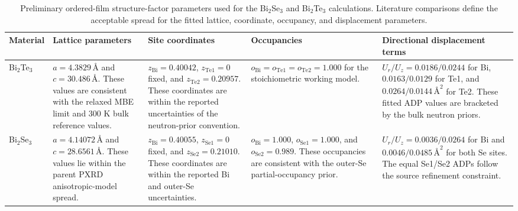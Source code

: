 \begin{table}[H]
  \centering
  \caption{Preliminary ordered-film structure-factor parameters used for the Bi$_2$Se$_3$ and Bi$_2$Te$_3$ calculations. Literature comparisons define the acceptable spread for the fitted lattice, coordinate, occupancy, and displacement parameters.}
  \label{tab:ordered_sf_parameters}
  \scriptsize
  \setlength{\tabcolsep}{3pt}
  \renewcommand{\arraystretch}{1.12}
  \begin{tabularx}{\linewidth}{@{}p{1.55cm} >{\raggedright\arraybackslash}X >{\raggedright\arraybackslash}X >{\raggedright\arraybackslash}X >{\raggedright\arraybackslash}X@{}}
    \toprule
    Material & Lattice parameters & Site coordinates & Occupancies & Directional displacement terms \\
    \midrule
    Bi$_2$Te$_3$ &
    $a=4.3829\,\text{\AA}$ and $c=30.486\,\text{\AA}$. These values are consistent with the relaxed MBE limit and 300 K bulk reference values.\cite{Mansour2014,Steiner2014} &
    $z_{\mathrm{Bi}}=0.40042$, $z_{\mathrm{Te1}}=0$ fixed, and $z_{\mathrm{Te2}}=0.20957$. These coordinates are within the reported uncertainties of the neutron-prior convention.\cite{Mansour2014} &
    $o_{\mathrm{Bi}}=o_{\mathrm{Te1}}=o_{\mathrm{Te2}}=1.000$ for the stoichiometric working model.\cite{Steiner2014,Gharsallah2016} &
    $U_r/U_z=0.0186/0.0244$ for Bi, $0.0163/0.0129$ for Te1, and $0.0264/0.0144\,\text{\AA}^2$ for Te2. These fitted ADP values are bracketed by the bulk neutron priors.\cite{Mansour2014,Trueblood1996} \\
    Bi$_2$Se$_3$ &
    $a=4.14072\,\text{\AA}$ and $c=28.6561\,\text{\AA}$. These values lie within the parent PXRD anisotropic-model spread.\cite{Callaert2019} &
    $z_{\mathrm{Bi}}=0.40055$, $z_{\mathrm{Se1}}=0$ fixed, and $z_{\mathrm{Se2}}=0.21010$. These coordinates are within the reported Bi and outer-Se uncertainties.\cite{Callaert2019} &
    $o_{\mathrm{Bi}}=1.000$, $o_{\mathrm{Se1}}=1.000$, and $o_{\mathrm{Se2}}=0.989$. These occupancies are consistent with the outer-Se partial-occupancy prior.\cite{Callaert2019} &
    $U_r/U_z=0.0036/0.0264$ for Bi and $0.0046/0.0485\,\text{\AA}^2$ for both Se sites. The equal Se1/Se2 ADPs follow the source refinement constraint.\cite{Callaert2019,Trueblood1996} \\
    \bottomrule
  \end{tabularx}
\end{table}
